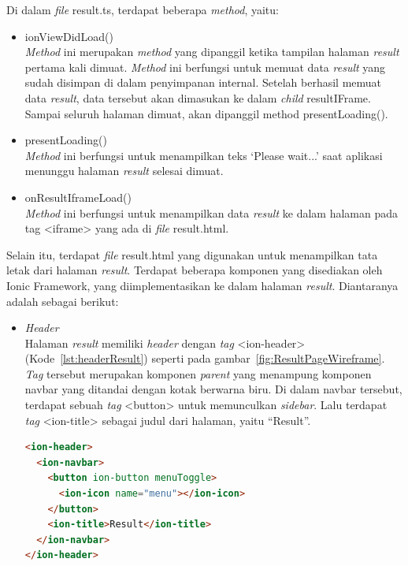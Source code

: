 \begin{itemize}
	Di dalam \textit{file} result.ts, terdapat beberapa \textit{method}, yaitu:
	
	\begin{itemize}
		\item ionViewDidLoad() \\
		\textit{Method} ini merupakan \textit{method} yang dipanggil ketika tampilan halaman \textit{result} pertama kali dimuat. \textit{Method} ini berfungsi untuk memuat data \textit{result} yang sudah disimpan di dalam penyimpanan internal. Setelah berhasil memuat data \textit{result}, data tersebut akan dimasukan ke dalam \textit{child} resultIFrame. Sampai seluruh halaman dimuat, akan dipanggil method presentLoading().

		\item presentLoading() \\
		\textit{Method} ini berfungsi untuk menampilkan teks `Please wait...' saat aplikasi menunggu halaman \textit{result} selesai dimuat.
		\item onResultIframeLoad() \\
		\textit{Method} ini berfungsi untuk menampilkan data \textit{result} ke dalam halaman pada tag <iframe> yang ada di \textit{file} result.html.
	\end{itemize}
	
	Selain itu, terdapat \textit{file} result.html yang digunakan untuk menampilkan tata letak dari halaman \textit{result}. Terdapat beberapa komponen yang disediakan oleh Ionic Framework, yang diimplementasikan ke dalam halaman \textit{result}. Diantaranya adalah sebagai berikut:
	
	\begin{itemize}
		\item \textit{Header} \\
		Halaman \textit{result} memiliki \textit{header} dengan \textit{tag} <ion-header> (Kode~\ref{lst:headerResult}) seperti pada gambar~\ref{fig:ResultPageWireframe}. \textit{Tag} tersebut merupakan komponen \textit{parent} yang menampung komponen navbar yang ditandai dengan kotak berwarna biru. Di dalam navbar tersebut, terdapat sebuah \textit{tag} <button> untuk memunculkan \textit{sidebar}. Lalu terdapat \textit{tag} <ion-title> sebagai judul dari halaman, yaitu ``Result''.

\begin{lstlisting}[language=html, label={lst:headerResult}, caption=\textit{Header} pada result.html]
<ion-header>
  <ion-navbar>
    <button ion-button menuToggle>
      <ion-icon name="menu"></ion-icon>
    </button>
    <ion-title>Result</ion-title>
  </ion-navbar>
</ion-header>
\end{lstlisting}


\end{itemize}
\end{itemize}

